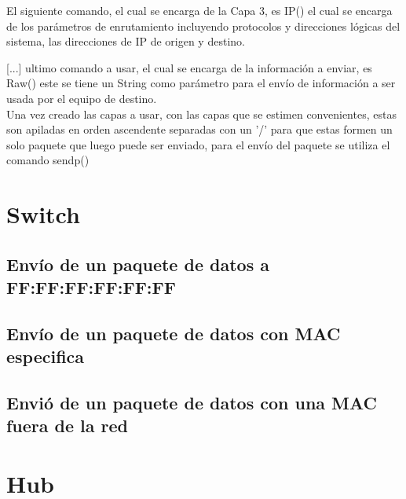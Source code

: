 \documentclass[spanish]{udpreport}
\begin{document}

El siguiente comando, el cual se encarga de la Capa 3, es IP() el cual se encarga de los parámetros de enrutamiento incluyendo protocolos y direcciones lógicas del sistema, las direcciones de IP de origen y destino.



[...] ultimo comando a usar, el cual se encarga de la información a enviar, es Raw() este se tiene un String como parámetro para el envío de información a ser usada por el equipo de destino.
\\

Una vez creado las capas a usar, con las capas que se estimen convenientes, estas son apiladas en orden ascendente separadas con un '/' para que estas formen un solo paquete que luego puede ser enviado, para el envío del paquete se utiliza el comando sendp() %


\newpage

\section{Switch}

\subsection{Envío de un paquete de datos a FF:FF:FF:FF:FF:FF}

\subsection{Envío de un paquete de datos con MAC especifica}

\subsection{Envió de un paquete de datos con una MAC fuera de la red}

\newpage

\section{Hub}
\end{document}
